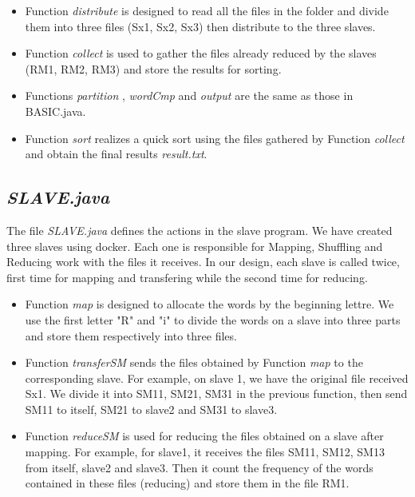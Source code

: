 \documentclass[a4paper,14pt,UTF8]{article}
\begin{document}
	
	\begin{itemize}
		
		\item 
		Function \textit{distribute} is designed to read all the files in the folder and divide them into three files (Sx1, Sx2, Sx3) then distribute to the three slaves. \\
		
		\item
		Function \textit{collect} is used to gather the files already reduced by the slaves (RM1, RM2, RM3) and store the results for sorting.\\
		
		\item 
		Functions \textit{partition} , \textit{wordCmp} and \textit{output} are the same as those in BASIC.java.	\\	
		
		\item 
		Function \textit{sort} realizes a quick sort using the files gathered by Function \textit{collect} and obtain the final results \textit{result.txt}.
		
	\end{itemize}

     
	\subsection{\textit{SLAVE.java}}
	
	\quad The file \textit{SLAVE.java} defines the actions in the slave program. We have created three slaves using docker. Each one is responsible for Mapping, Shuffling and Reducing work with the files it receives. In our design, each slave is called twice, first time for mapping and transfering while the second time for reducing.\par

	
	\begin{itemize}
		
		\item 
		Function \textit{map} is designed to allocate the words by the beginning lettre. We use the first letter "R" and "i" to divide the words on a slave into three parts and store them respectively into three files. \\
		
		\item
		Function \textit{transferSM} sends the files obtained by Function  \textit{map} to the corresponding slave. For example, on slave 1, we have the original file received Sx1. We divide it into SM11, SM21, SM31 in the previous function, then send SM11 to itself, SM21 to slave2 and SM31 to slave3.  \\
		
		\item
		Function \textit{reduceSM} is used for reducing the files obtained on a slave after mapping. For example, for slave1, it receives the files SM11, SM12, SM13 from itself, slave2 and slave3. Then it count the frequency of the words contained in these files (reducing) and store them in the file RM1. \\
		
	\end{itemize}
	  
\end{document}
